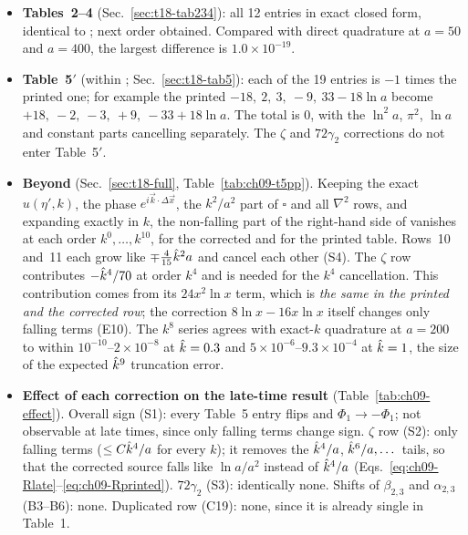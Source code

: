 \begin{itemize}[leftmargin=14pt,itemsep=2pt]
\item[\textbf{E7}] \textbf{Tables~2--4} (Sec.~\ref{sec:t18-tab234}): all 12 entries in exact closed form, identical to \PII; next order obtained. Compared with
direct quadrature at $a=50$ and $a=400$, the largest difference is $1.0\times10^{-19}$.
\item[\textbf{E8}] \textbf{Table~5$'$} (within ; Sec.~\ref{sec:t18-tab5}): each of the 19 entries is $-1$ times the printed one; for example the
printed $-18,\ 2,\ 3,\ -9,\ 33-18\ln a$ become $+18,\ -2,\ -3,\ +9,\ -33+18\ln a$. The total is $0$, with the $\ln^2a$, $\pi^2$, $\ln a$ and constant parts
cancelling separately. The $\zeta$ and $72\gamma_2$ corrections do not enter Table~5$'$.
\item[\textbf{E9}] \textbf{Beyond } (Sec.~\ref{sec:t18-full}, Table~\ref{tab:ch09-t5pp}). Keeping the exact $u(\eta',k)$, the phase
$e^{i\vec k\cdot\Delta\vec x}$, the $k^2/a^2$ part of $\square$ and all $\nabla^2$ rows, and expanding exactly in $k$, the non-falling part of the
right-hand side of  vanishes at each order $k^0,\dots,k^{10}$, for the corrected and for the printed table. Rows~10 and~11 each grow like
$\mp\tfrac{4}{15}\hat k^2a$ and cancel each other (S4). The $\zeta$ row contributes $-\hat k^4/70$ at order $k^4$ and is needed for the $k^4$
cancellation. This contribution comes from its $24x^2\ln x$ term, which is \emph{the same in the printed and the corrected row}; the correction
$8\ln x-16x\ln x$ itself changes only falling terms (E10). The $k^8$ series agrees with exact-$k$ quadrature at $a=200$ to within
$10^{-10}$--$2\times10^{-8}$ at $\hat k=0.3$ and $5\times10^{-6}$--$9.3\times10^{-4}$ at $\hat k=1$, the size of the expected $\hat k^9$ truncation error.
\item[\textbf{E10}] \textbf{Effect of each correction on the late-time result} (Table~\ref{tab:ch09-effect}). Overall sign (S1): every Table~5 entry
flips and $\Phi_1\to-\Phi_1$; not observable at late times, since only falling terms change sign. $\zeta$ row (S2): only falling terms
($\le C\hat k^4/a$ for every $k$); it removes the $\hat k^4/a$, $\hat k^6/a,\dots$ tails, so that the corrected source falls like $\ln a/a^2$ instead of
$\hat k^4/a$ (Eqs.~\eqref{eq:ch09-Rlate}--\eqref{eq:ch09-Rprinted}). $72\gamma_2$ (S3): identically none. Shifts of $\beta_{2,3}$ and $\alpha_{2,3}$
(B3--B6): none. Duplicated row (C19): none, since it is already single in \PII{} Table~1.
\end{itemize}

